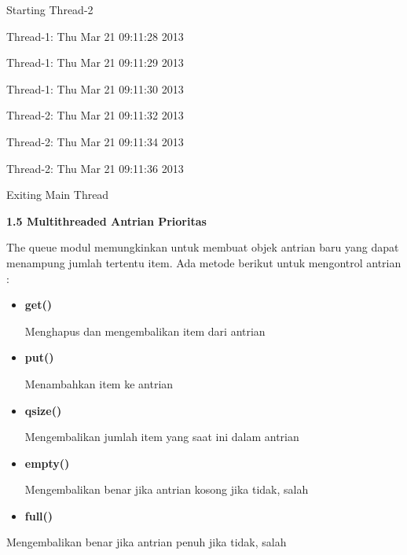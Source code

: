 \noindent 
{\fontsize{10pt}{10pt}\selectfont Starting Thread-2} \par
\noindent 
{\fontsize{10pt}{10pt}\selectfont Thread-1: Thu Mar 21 09:11:28 2013} \par
\noindent 
{\fontsize{10pt}{10pt}\selectfont Thread-1: Thu Mar 21 09:11:29 2013} \par
\noindent 
{\fontsize{10pt}{10pt}\selectfont Thread-1: Thu Mar 21 09:11:30 2013} \par
\noindent 
{\fontsize{10pt}{10pt}\selectfont Thread-2: Thu Mar 21 09:11:32 2013} \par
\noindent 
{\fontsize{10pt}{10pt}\selectfont Thread-2: Thu Mar 21 09:11:34 2013} \par
\noindent 
{\fontsize{10pt}{10pt}\selectfont Thread-2: Thu Mar 21 09:11:36 2013} \par
\noindent 
{\fontsize{10pt}{10pt}\selectfont Exiting Main Thread} \par
\vspace{12pt}
\textbf{1.5 Multithreaded Antrian Prioritas} \par
The queue modul memungkinkan untuk membuat objek antrian baru yang dapat menampung jumlah tertentu item. Ada metode berikut untuk mengontrol antrian : \par
\begin{itemize}
	\item \textbf{get()} \par
		Menghapus dan mengembalikan item dari antrian
	\par
	\item \textbf{put()} \par
		Menambahkan item ke antrian
	\par
	\item \textbf{qsize()} \par
		Mengembalikan jumlah item yang saat ini dalam antrian
	\par
	\item \textbf{empty()} \par
		Mengembalikan benar jika antrian kosong jika tidak, salah
	\par
	\item \textbf{full()}\end{itemize}
\par
	Mengembalikan benar jika antrian penuh jika tidak, salah
\par
\vspace{12pt}
\vspace{12pt}
\vspace{12pt}
